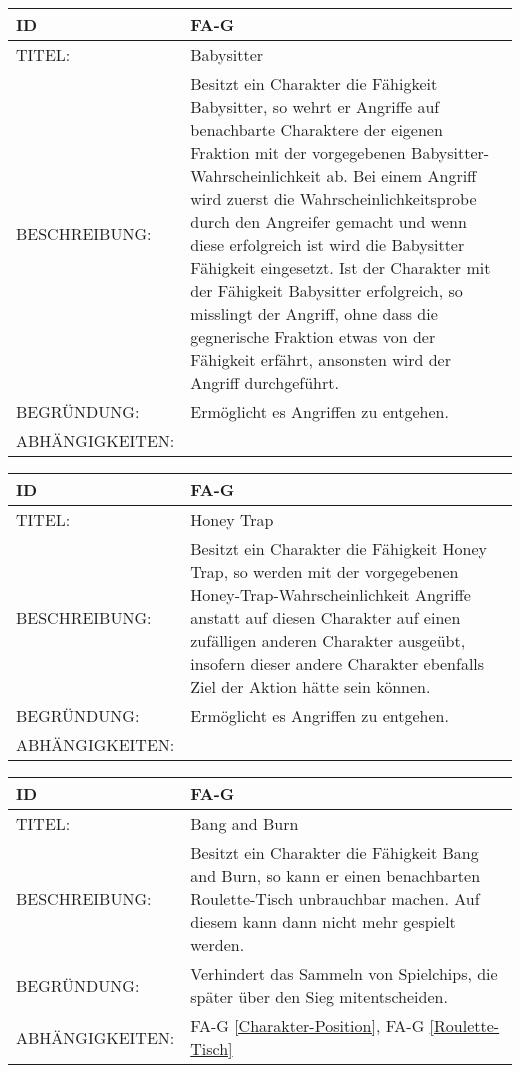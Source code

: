 \begin{tabularx}{16cm}{l|X}
	{table}\label{Babysitter}
	\textbf{ID} & \textbf{FA-G \arabic{table}} \\
	\hline
	TITEL: & Babysitter \\
	\hline
	BESCHREIBUNG: & Besitzt ein Charakter die Fähigkeit Babysitter, so wehrt er Angriffe auf benachbarte Charaktere der eigenen Fraktion mit der vorgegebenen Babysitter-Wahrscheinlichkeit ab. Bei einem Angriff wird zuerst die Wahrscheinlichkeitsprobe durch den Angreifer gemacht und wenn diese erfolgreich ist wird die Babysitter Fähigkeit eingesetzt. Ist der Charakter mit der Fähigkeit Babysitter erfolgreich, so misslingt der Angriff, ohne dass die gegnerische Fraktion etwas von der Fähigkeit erfährt, ansonsten wird der Angriff durchgeführt.\\
	\hline
	BEGRÜNDUNG: & Ermöglicht es Angriffen zu entgehen.\\
	\hline
	ABHÄNGIGKEITEN: & \\
\end{tabularx}

\begin{tabularx}{16cm}{l|X}
	{table}\label{Honey Trap}
	\textbf{ID} & \textbf{FA-G \arabic{table}} \\
	\hline
	TITEL: & Honey Trap \\
	\hline
	BESCHREIBUNG: & Besitzt ein Charakter die Fähigkeit Honey Trap, so werden mit der vorgegebenen Honey-Trap-Wahrscheinlichkeit Angriffe anstatt auf diesen Charakter auf einen zufälligen anderen Charakter ausgeübt, insofern dieser andere Charakter ebenfalls Ziel der Aktion hätte sein können.\\
	\hline
	BEGRÜNDUNG: & Ermöglicht es Angriffen zu entgehen.\\
	\hline
	ABHÄNGIGKEITEN: & \\
\end{tabularx}

\begin{tabularx}{16cm}{l|X}
	{table}\label{Bang and Burn}
	\textbf{ID} & \textbf{FA-G \arabic{table}} \\
	\hline
	TITEL: & Bang and Burn \\
	\hline
	BESCHREIBUNG: & Besitzt ein Charakter die Fähigkeit Bang and Burn, so kann er einen benachbarten Roulette-Tisch unbrauchbar machen. Auf diesem kann dann nicht mehr gespielt werden.\\
	\hline
	BEGRÜNDUNG: & Verhindert das Sammeln von Spielchips, die später über den Sieg mitentscheiden.\\
	\hline
	ABHÄNGIGKEITEN: & FA-G \ref{Charakter-Position}, FA-G \ref{Roulette-Tisch}\\
\end{tabularx}

